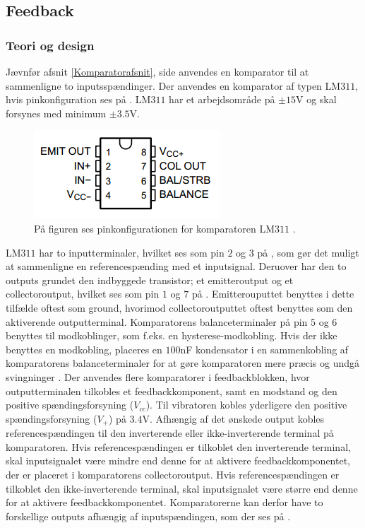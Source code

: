 \subsection{Feedback}
\subsubsection{Teori og design} \label{Afs_Komparator}
Jævnfør afsnit \ref{Komparatorafsnit}, side \pageref{Komparatorafsnit} anvendes en komparator til at sammenligne to inputsspændinger. Der anvendes en komparator af typen LM$311$, hvis pinkonfiguration ses på . LM$311$ har et arbejdsområde på $\pm15$V og skal forsynes med minimum $\pm3.5$V. 
\begin{figure}[H] 
	\centering
	\includegraphics[scale=0.9]{figures/cProblemloesning/LM311.PNG}
	\caption{På figuren ses pinkonfigurationen for komparatoren LM$311$ \cite{Instruments2015}.}
	\label{fig:LM311}
\end{figure}
\noindent LM$311$ har to inputterminaler, hvilket ses som pin $2$ og $3$ på , som gør det muligt at sammenligne en referencespænding med et inputsignal. Deruover har den to outputs grundet den indbyggede transistor; et emitteroutput og et collectoroutput, hvilket ses som pin $1$ og $7$ på . Emitterouputtet benyttes i dette tilfælde oftest som ground, hvorimod collectoroutputtet oftest benyttes som den aktiverende outputterminal. Komparatorens balanceterminaler på pin $5$ og $6$ benyttes til modkoblinger, som f.eks. en hysterese-modkobling. Hvis der ikke benyttes en modkobling, placeres en $100$nF kondensator i en sammenkobling af komparatorens balanceterminaler for at gøre komparatoren mere præcis og undgå svingninger \cite{Instruments2015}. 
Der anvendes flere komparatorer i feedbackblokken, hvor outputterminalen tilkobles et feedbackkomponent, samt en modstand og den positive spændingsforsyning ($V_{cc}$). Til vibratoren kobles yderligere den positive spændingsforsyning ($V_+$) på $3.4$V. Afhængig af det ønskede output kobles referencespændingen til den inverterende eller ikke-inverterende terminal på komparatoren. Hvis referencespændingen er tilkoblet den inverterende terminal, skal inputsignalet være mindre end denne for at aktivere feedbackkomponentet, der er placeret i komparatorens collectoroutput. Hvis referencespændingen er tilkoblet den ikke-inverterende terminal, skal inputsignalet være større end denne for at aktivere feedbackkomponentet. Komparatorerne kan derfor have to forskellige outputs afhængig af inputspændingen, som der ses på . 
